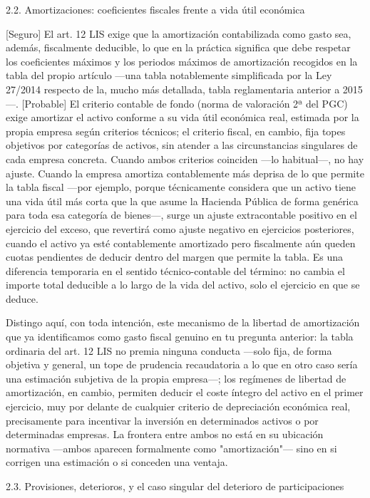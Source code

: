 \documentclass[10pt,a4paper]{article}
\begin{document}
2.2. Amortizaciones: coeficientes fiscales frente a vida útil económica

[Seguro] El art. 12 LIS exige que la amortización contabilizada como gasto sea, además, fiscalmente deducible, lo que en la práctica significa que debe respetar los coeficientes máximos y los periodos máximos de amortización recogidos en la tabla del propio artículo —una tabla notablemente simplificada por la Ley 27/2014 respecto de la, mucho más detallada, tabla reglamentaria anterior a 2015—. [Probable] El criterio contable de fondo (norma de valoración 2ª del PGC) exige amortizar el activo conforme a su vida útil económica real, estimada por la propia empresa según criterios técnicos; el criterio fiscal, en cambio, fija topes objetivos por categorías de activos, sin atender a las circunstancias singulares de cada empresa concreta. Cuando ambos criterios coinciden —lo habitual—, no hay ajuste. Cuando la empresa amortiza contablemente más deprisa de lo que permite la tabla fiscal —por ejemplo, porque técnicamente considera que un activo tiene una vida útil más corta que la que asume la Hacienda Pública de forma genérica para toda esa categoría de bienes—, surge un ajuste extracontable positivo en el ejercicio del exceso, que revertirá como ajuste negativo en ejercicios posteriores, cuando el activo ya esté contablemente amortizado pero fiscalmente aún queden cuotas pendientes de deducir dentro del margen que permite la tabla. Es una diferencia temporaria en el sentido técnico-contable del término: no cambia el importe total deducible a lo largo de la vida del activo, solo el ejercicio en que se deduce.

Distingo aquí, con toda intención, este mecanismo de la libertad de amortización que ya identificamos como gasto fiscal genuino en tu pregunta anterior: la tabla ordinaria del art. 12 LIS no premia ninguna conducta —solo fija, de forma objetiva y general, un tope de prudencia recaudatoria a lo que en otro caso sería una estimación subjetiva de la propia empresa—; los regímenes de libertad de amortización, en cambio, permiten deducir el coste íntegro del activo en el primer ejercicio, muy por delante de cualquier criterio de depreciación económica real, precisamente para incentivar la inversión en determinados activos o por determinadas empresas. La frontera entre ambos no está en su ubicación normativa —ambos aparecen formalmente como "amortización"— sino en si corrigen una estimación o si conceden una ventaja.

2.3. Provisiones, deterioros, y el caso singular del deterioro de participaciones
\end{document}
